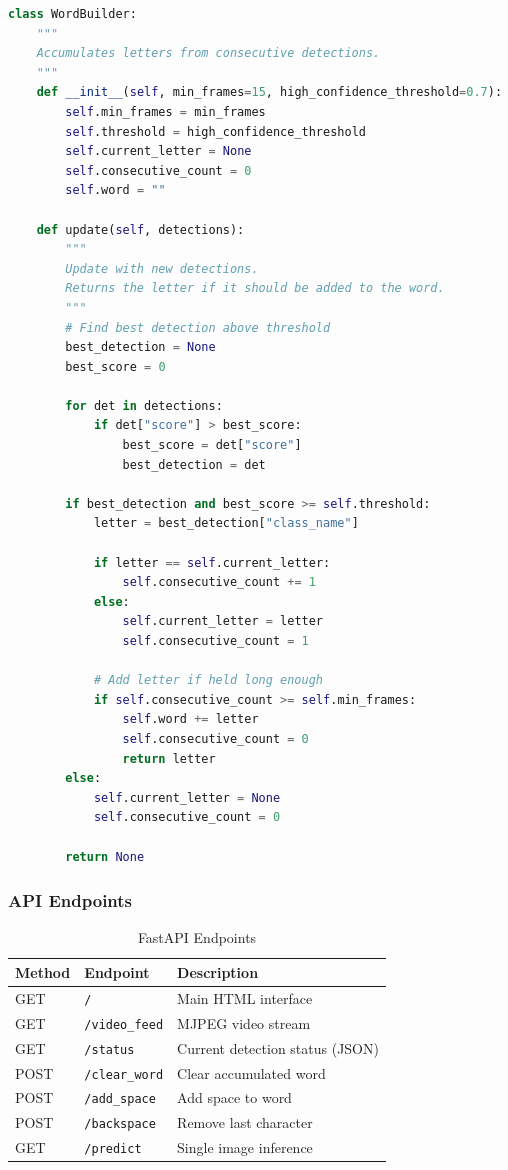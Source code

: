 \documentclass[12pt,a4paper]{article}
\begin{document}
\begin{lstlisting}[language=python, caption=WordBuilder Class]
class WordBuilder:
    """
    Accumulates letters from consecutive detections.
    """
    def __init__(self, min_frames=15, high_confidence_threshold=0.7):
        self.min_frames = min_frames
        self.threshold = high_confidence_threshold
        self.current_letter = None
        self.consecutive_count = 0
        self.word = ""
    
    def update(self, detections):
        """
        Update with new detections.
        Returns the letter if it should be added to the word.
        """
        # Find best detection above threshold
        best_detection = None
        best_score = 0
        
        for det in detections:
            if det["score"] > best_score:
                best_score = det["score"]
                best_detection = det
        
        if best_detection and best_score >= self.threshold:
            letter = best_detection["class_name"]
            
            if letter == self.current_letter:
                self.consecutive_count += 1
            else:
                self.current_letter = letter
                self.consecutive_count = 1
            
            # Add letter if held long enough
            if self.consecutive_count >= self.min_frames:
                self.word += letter
                self.consecutive_count = 0
                return letter
        else:
            self.current_letter = None
            self.consecutive_count = 0
        
        return None
\end{lstlisting}

\subsubsection{API Endpoints}

\begin{table}[H]
    \centering
    \caption{FastAPI Endpoints}
    \label{tab:endpoints}
    \begin{tabular}{|l|l|p{6cm}|}
        \hline
        \textbf{Method} & \textbf{Endpoint} & \textbf{Description} \\
        \hline
        GET & \texttt{/} & Main HTML interface \\
        GET & \texttt{/video\_feed} & MJPEG video stream \\
        GET & \texttt{/status} & Current detection status (JSON) \\
        POST & \texttt{/clear\_word} & Clear accumulated word \\
        POST & \texttt{/add\_space} & Add space to word \\
        POST & \texttt{/backspace} & Remove last character \\
        GET & \texttt{/predict} & Single image inference \\
        \hline
    \end{tabular}
\end{table}
\end{document}

